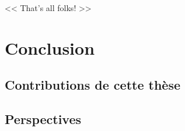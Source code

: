 \begin{savequote}[6cm]
<< That's all folks! >>
\end{savequote}

\chapter{Conclusion}\label{chap:conclusion}
\chaptertoc

\section*{Contributions de cette thèse}


\section*{Perspectives}




